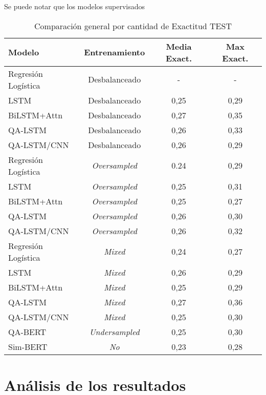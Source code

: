 Se puede notar que los modelos supervisados 


\begin{table}[!tb]
  \begin{center}
    \caption{Comparación general por cantidad de Exactitud TEST}
    \begin{tabular}{l|c|c|c}
      \textbf{Modelo} & \textbf{Entrenamiento} & \textbf{Media Exact.} & \textbf{Max Exact.}\\
      \hline
      Regresión Logística & Desbalanceado & - & - \\
      LSTM & Desbalanceado & 0,25 & 0,29 \\
      BiLSTM+Attn & Desbalanceado & 0,27 & 0,35 \\
      QA-LSTM & Desbalanceado & 0,26 & 0,33 \\
      QA-LSTM/CNN & Desbalanceado & 0,26 & 0,29 \\

      Regresión Logística & \textit{Oversampled} & 0.24 & 0,29 \\
      LSTM & \textit{Oversampled} & 0,25 & 0,31 \\
      BiLSTM+Attn & \textit{Oversampled} & 0,25 & 0,27 \\
      QA-LSTM & \textit{Oversampled} & 0,26 & 0,30 \\
      QA-LSTM/CNN & \textit{Oversampled} & 0,26 & 0,32 \\

      Regresión Logística & \textit{Mixed} & 0,24 & 0,27 \\
      LSTM & \textit{Mixed} & 0,26 & 0,29 \\
      BiLSTM+Attn & \textit{Mixed} & 0,25 & 0,29 \\
      QA-LSTM & \textit{Mixed} & 0,27 & 0,36 \\
      QA-LSTM/CNN & \textit{Mixed} & 0,25 & 0,30 \\

      QA-BERT & \textit{Undersampled} & 0,25 & 0,30 \\
      Sim-BERT & \textit{No} & 0,23 & 0,28 \\
      
    \end{tabular}
  \end{center}
  \label{comparison_acc_general}
\end{table}


\section{Análisis de los resultados}


